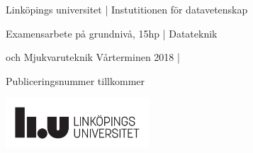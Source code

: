 \begin{titlepage}
	\vspace{10em}
\begin{minipage}{.85\linewidth}
\begin{center}Linköpings universitet | Instutitionen för datavetenskap\par%
Examensarbete på grundnivå, 15hp | Datateknik\par%
och Mjukvaruteknik Vårterminen 2018 |\par
Publiceringsnummer tillkommer

	\includegraphics[width=0.4\textwidth]{../Templates/liu_primary_black_sv.pdf}\\[2cm] %

\end{center}
\end{minipage}

	~

	\vfill\vfill



	\vfill %

\end{titlepage}


